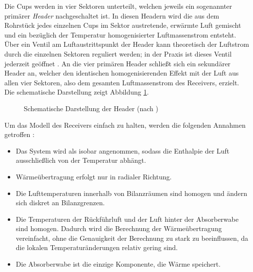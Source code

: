 Die Cups werden in vier Sektoren unterteilt, welchen jeweils ein sogenannter primärer \textit{Header} nachgeschaltet ist.
In diesen Headern wird die aus dem Rohrstück jedes einzelnen Cups im Sektor austretende, erwärmte Luft gemischt und ein bezüglich der Temperatur homogenisierter Luftmassenstrom entsteht.
Über ein Ventil am Luftaustrittspunkt der Header kann theoretisch der Luftstrom durch die einzelnen Sektoren reguliert werden; in der Praxis ist dieses Ventil jederzeit geöffnet \cite{IdingSolarPaces}.
An die vier primären Header schließt sich ein sekundärer Header an, welcher den identischen homogenisierenden Effekt mit der Luft aus allen vier Sektoren, also dem gesamten Luftmassenstrom des Receivers, erzielt.
Die schematische Darstellung zeigt Abbildung \ref{fig_HeaderSchema}.

\begin{figure}[h!]
    \centering
    \setlength{\fboxsep}{8pt}
    \setlength{\fboxrule}{1pt}
    \caption[Schematische Darstellung der Header]{Schematische Darstellung der Header (nach \cite[S.90]{DissGall})}
    \label{fig_HeaderSchema}
\end{figure}

Um das Modell des Receivers einfach zu halten, werden die folgenden Annahmen getroffen \cite[S.92]{DissGall}:
\begin{itemize}
    \item Das System wird als isobar angenommen, sodass die Enthalpie der Luft ausschließlich von der Temperatur abhängt.
    \item Wärmeübertragung erfolgt nur in radialer Richtung.
    \item Die Lufttemperaturen innerhalb von Bilanzräumen sind homogen und ändern sich diskret an Bilanzgrenzen.
    \item Die Temperaturen der Rückführluft und der Luft hinter der Absorberwabe sind homogen.
Dadurch wird die Berechnung der Wärmeübertragung vereinfacht, ohne die Genauigkeit der Berechnung zu stark zu beeinflussen, da die lokalen Temperaturänderungen relativ gering sind.
    \item Die Absorberwabe ist die einzige Komponente, die Wärme speichert.
\end{itemize}


